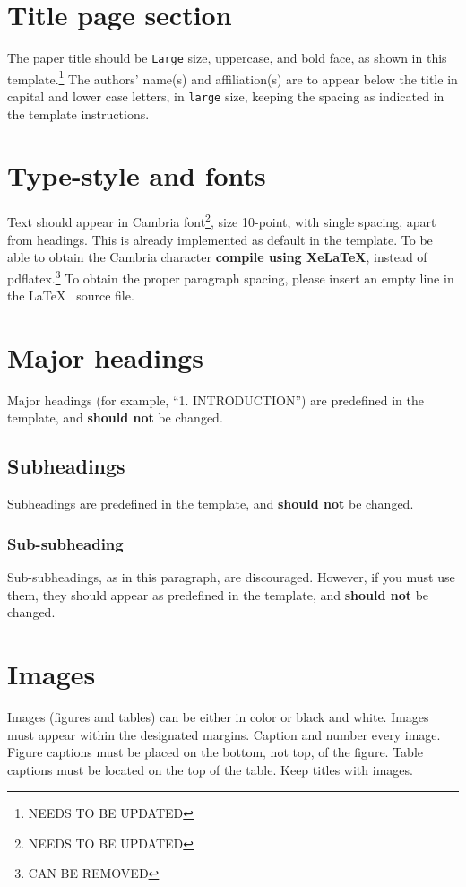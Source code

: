 \documentclass[10pt,a4paper,twocolumn]{article}
\begin{document}
\section{Title page section}
\label{sec:sec3}
The paper title should be \texttt{Large} size, uppercase, and bold face, as shown in this template.\footnote{NEEDS TO BE UPDATED}
The authors' name(s) and affiliation(s) are to appear below the title in capital and lower case letters, in \texttt{large} size, keeping the spacing as indicated in the template instructions.



\section{Type-style and fonts}
\label{sec:sec4}
Text should appear in Cambria font\footnote{NEEDS TO BE UPDATED}, size 10-point, with single spacing, apart from headings.
This is already implemented as default in the template.
To be able to obtain the Cambria character \textbf{compile using XeLaTeX}, instead of pdflatex.\footnote{CAN BE REMOVED}
To obtain the proper paragraph spacing, please insert an empty line in the \LaTeX~ source file.


\section{Major headings}
\label{sec:sec5}
Major headings (for example, ``1. INTRODUCTION'') are predefined in the template, and \textbf{should not} be changed.

\subsection{Subheadings}
\label{ssec:sec5.1}
Subheadings are predefined in the template, and \textbf{should not} be changed.

\subsubsection{Sub-subheading}
\label{sssec:sec5.1.1}
Sub-subheadings, as in this paragraph, are discouraged.
However, if you must use them, they should appear as predefined in the template, and \textbf{should not} be changed.


\section{Images}
\label{sec:sec6}
Images (figures and tables) can be either in color or black and white.
Images must appear within the designated margins.
Caption and number every image.
Figure captions must be placed on the bottom, not top, of the figure.
Table captions must be located on the top of the table.
Keep titles with images. 
\end{document}
